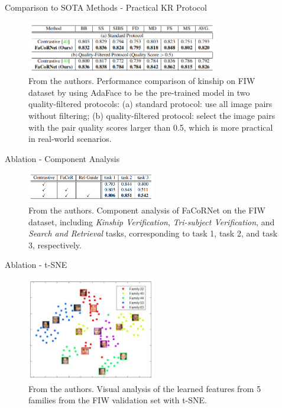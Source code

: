 \documentclass[aspectratio=169,xcolor=dvipsnames]{beamer}
\begin{document}

\begin{frame}{Comparison to SOTA Methods - Practical KR Protocol}
    \begin{figure}
        \centering
        \includegraphics[width=0.75\textwidth]{imgs/T5.png}
        \caption{From the authors. Performance comparison of kinship on FIW dataset by using AdaFace to be the pre-trained model in two quality-filtered protocols: (a) standard protocol: use all image pairs without filtering; (b) quality-filtered protocol: select the image pairs with the pair quality scores larger than 0.5, which is more practical in real-world scenarios.}
        \label{fig:results-t5}
    \end{figure}
\end{frame}


\begin{frame}{Ablation - Component Analysis}
    \begin{figure}
        \centering
        \includegraphics[width=0.5\textwidth]{imgs/T6.png}
        \caption{From the authors. Component analysis of FaCoRNet on the FIW dataset, including \textit{Kinship Verification}, \textit{Tri-subject Verification}, and \textit{Search and Retrieval} tasks, corresponding to task 1, task 2, and task 3, respectively.}
        \label{fig:results-t6}
    \end{figure}
\end{frame}


\begin{frame}{Ablation - t-SNE}
    \begin{figure}
        \centering
        \includegraphics[width=0.5\textwidth]{imgs/F3.png}
        \caption{From the authors. Visual analysis of the learned features from 5 families from the FIW validation set with t-SNE.}
        \label{fig:results-f3}
    \end{figure}
\end{frame}
\end{document}
